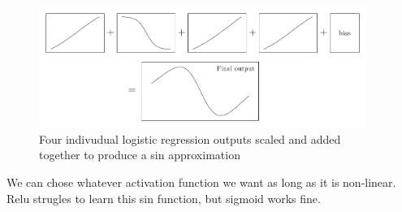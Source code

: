\documentclass[twoside,11pt]{report}
\begin{document}
\begin{figure}
    \begin{center}
        \includegraphics[width=0.95\textwidth]{tikzfigures/universal.pdf}
    \end{center}
    \caption{Four indivudual logistic regression outputs scaled and added together to produce 
    a sin approximation}\label{fig:}
\end{figure}


We can chose whatever activation function we want as long as it is non-linear. Relu strugles to learn this 
sin function, but sigmoid works fine.











\vskip 0.2in

% 

%
\end{document}
